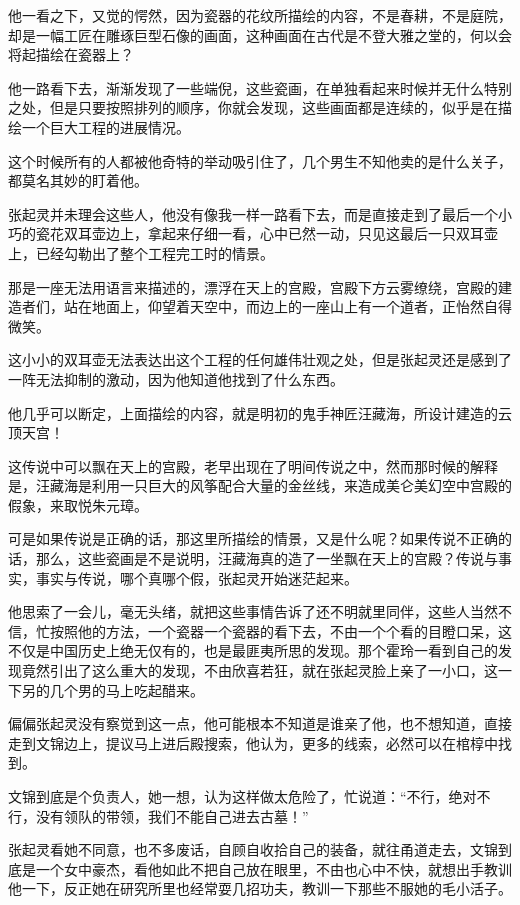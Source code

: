 他一看之下，又觉的愕然，因为瓷器的花纹所描绘的内容，不是春耕，不是庭院，却是一幅工匠在雕琢巨型石像的画面，这种画面在古代是不登大雅之堂的，何以会将起描绘在瓷器上？

他一路看下去，渐渐发现了一些端倪，这些瓷画，在单独看起来时候并无什么特别之处，但是只要按照排列的顺序，你就会发现，这些画面都是连续的，似乎是在描绘一个巨大工程的进展情况。

这个时候所有的人都被他奇特的举动吸引住了，几个男生不知他卖的是什么关子，都莫名其妙的盯着他。

张起灵并未理会这些人，他没有像我一样一路看下去，而是直接走到了最后一个小巧的瓷花双耳壶边上，拿起来仔细一看，心中已然一动，只见这最后一只双耳壶上，已经勾勒出了整个工程完工时的情景。

那是一座无法用语言来描述的，漂浮在天上的宫殿，宫殿下方云雾缭绕，宫殿的建造者们，站在地面上，仰望着天空中，而边上的一座山上有一个道者，正怡然自得微笑。

这小小的双耳壶无法表达出这个工程的任何雄伟壮观之处，但是张起灵还是感到了一阵无法抑制的激动，因为他知道他找到了什么东西。

他几乎可以断定，上面描绘的内容，就是明初的鬼手神匠汪藏海，所设计建造的云顶天宫！

这传说中可以飘在天上的宫殿，老早出现在了明间传说之中，然而那时候的解释是，汪藏海是利用一只巨大的风筝配合大量的金丝线，来造成美仑美幻空中宫殿的假象，来取悦朱元璋。

可是如果传说是正确的话，那这里所描绘的情景，又是什么呢？如果传说不正确的话，那么，这些瓷画是不是说明，汪藏海真的造了一坐飘在天上的宫殿？传说与事实，事实与传说，哪个真哪个假，张起灵开始迷茫起来。

他思索了一会儿，毫无头绪，就把这些事情告诉了还不明就里同伴，这些人当然不信，忙按照他的方法，一个瓷器一个瓷器的看下去，不由一个个看的目瞪口呆，这不仅是中国历史上绝无仅有的，也是最匪夷所思的发现。那个霍玲一看到自己的发现竟然引出了这么重大的发现，不由欣喜若狂，就在张起灵脸上亲了一小口，这一下另的几个男的马上吃起醋来。

偏偏张起灵没有察觉到这一点，他可能根本不知道是谁亲了他，也不想知道，直接走到文锦边上，提议马上进后殿搜索，他认为，更多的线索，必然可以在棺椁中找到。

文锦到底是个负责人，她一想，认为这样做太危险了，忙说道：“不行，绝对不行，没有领队的带领，我们不能自己进去古墓！”

张起灵看她不同意，也不多废话，自顾自收拾自己的装备，就往甬道走去，文锦到底是一个女中豪杰，看他如此不把自己放在眼里，不由也心中不快，就想出手教训他一下，反正她在研究所里也经常耍几招功夫，教训一下那些不服她的毛小活子。

